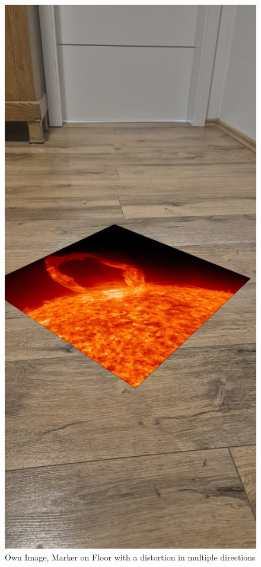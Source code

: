 \documentclass[a4paper,twocolumn]{article}
\begin{document}
\begin{figure}[htbp]
    \centering
    \includegraphics[width=\columnwidth, keepaspectratio]{newOutput/20241129_153124.jpeg}
    \caption{Own Image, Marker on Floor with a distortion in multiple directions \cite{tim-schweitzer}}
    \label{fig:example-appendix2}
\end{figure}
\end{document}
